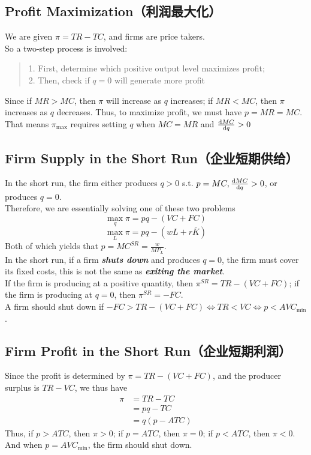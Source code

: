 \subsection{Profit Maximization（利润最大化）}
We are given $\pi = TR - TC$, and firms are price takers. \\
So a two-step process is involved:
\begin{quote}
    1. First, determine which positive output level maximizes profit; \\
    2. Then, check if $q=0$ will generate more profit
\end{quote}
Since if $MR > MC$, then $\pi$ will increase as $q$ increases; if $MR < MC$, then $\pi$ increases as $q$ decreases. Thus, to maximize profit, we must have $p = MR = MC$. That means $\pi_{\max}$ requires setting $q$ when $MC = MR$ and $\dv{MC}{q} > 0$

\subsection{Firm Supply in the Short Run（企业短期供给）}
In the short run, the firm either produces $q > 0$ s.t. $p = MC, \dv{MC}{q} > 0$, or produces $q = 0$. \\
Therefore, we are essentially solving one of these two problems
$$\max_q \pi = pq - (VC + FC)$$
$$\max_L \pi = pq - (wL + r\bar{K})$$
Both of which yields that $p = MC^{SR} = \frac{w}{MP_L}$. \\
In the short run, if a firm \textbf{\textit{shuts down}} and produces $q = 0$, the firm must cover its fixed costs, this is not the same as \textbf{\textit{exiting the market}}. \\
If the firm is producing at a positive quantity, then $\pi^{SR} = TR - (VC + FC)$; if the firm is producing at $q = 0$, then $\pi^{SR} = -FC$. \\
A firm should shut down if $-FC > TR - (VC + FC) \iff TR < VC \iff p < AVC_{\min}$.

\subsection{Firm Profit in the Short Run（企业短期利润）}
Since the profit is determined by $\pi = TR - (VC + FC)$, and the producer surplus is $TR - VC$, we thus have
\begin{align*}
    \pi &= TR - TC \\
    &= pq - TC \\
    &= q(p - ATC)
\end{align*}
Thus, if $p > ATC$, then $\pi > 0$; if $p = ATC$, then $\pi = 0$; if $p < ATC$, then $\pi < 0$. And when $p = AVC_{\min}$, the firm should shut down.

